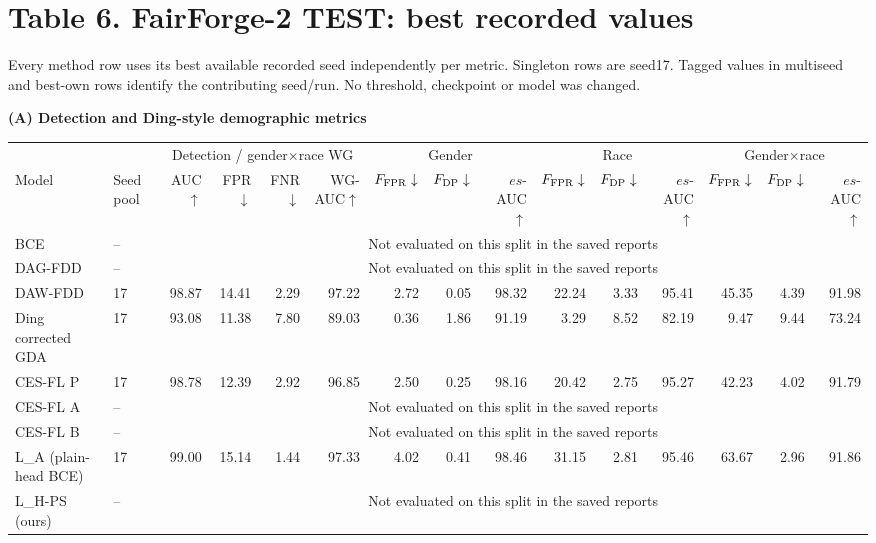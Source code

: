 \documentclass[10pt]{article}
\newcommand{\note}[1]{{\fontsize{8}{10}\selectfont #1\par}}
\begin{document}
\clearpage\section*{Table 6. FairForge-2 TEST: best recorded values}
\note{Every method row uses its best available recorded seed independently per metric. Singleton rows are seed17. Tagged values in multiseed and best-own rows identify the contributing seed/run. No threshold, checkpoint or model was changed.}
\textbf{(A) Detection and Ding-style demographic metrics}\par
{\fontsize{7.6}{9.1}\selectfont\setlength{\tabcolsep}{3pt}
\renewcommand{\arraystretch}{1.05}
\begin{tabular*}{\linewidth}{@{\extracolsep{\fill}}llrrrrrrrrrrrrr}\toprule
 & & \multicolumn{4}{c}{Detection / gender$\times$race WG} & \multicolumn{3}{c}{Gender} & \multicolumn{3}{c}{Race} & \multicolumn{3}{c}{Gender$\times$race}\\
Model & Seed pool & AUC$\uparrow$ & FPR$\downarrow$ & FNR$\downarrow$ & WG-AUC$\uparrow$ & $F_{\rm FPR}\downarrow$ & $F_{\rm DP}\downarrow$ & $es$-AUC$\uparrow$ & $F_{\rm FPR}\downarrow$ & $F_{\rm DP}\downarrow$ & $es$-AUC$\uparrow$ & $F_{\rm FPR}\downarrow$ & $F_{\rm DP}\downarrow$ & $es$-AUC$\uparrow$\\\midrule
BCE & -- & \multicolumn{13}{c}{Not evaluated on this split in the saved reports}\\
DAG-FDD & -- & \multicolumn{13}{c}{Not evaluated on this split in the saved reports}\\
DAW-FDD & 17 & 98.87 & 14.41 & 2.29 & 97.22 & 2.72 & 0.05 & 98.32 & 22.24 & 3.33 & 95.41 & 45.35 & 4.39 & 91.98\\
Ding corrected GDA & 17 & 93.08 & 11.38 & 7.80 & 89.03 & 0.36 & 1.86 & 91.19 & 3.29 & 8.52 & 82.19 & 9.47 & 9.44 & 73.24\\
CES-FL P & 17 & 98.78 & 12.39 & 2.92 & 96.85 & 2.50 & 0.25 & 98.16 & 20.42 & 2.75 & 95.27 & 42.23 & 4.02 & 91.79\\
CES-FL A & -- & \multicolumn{13}{c}{Not evaluated on this split in the saved reports}\\
CES-FL B & -- & \multicolumn{13}{c}{Not evaluated on this split in the saved reports}\\
L\_A (plain-head BCE) & 17 & 99.00 & 15.14 & 1.44 & 97.33 & 4.02 & 0.41 & 98.46 & 31.15 & 2.81 & 95.46 & 63.67 & 2.96 & 91.86\\
L\_H-PS (ours) & -- & \multicolumn{13}{c}{Not evaluated on this split in the saved reports}\\

\end{tabular*}}
\end{document}
